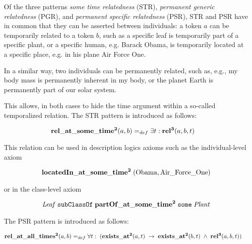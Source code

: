 
 

Of the three patterns \emph{some time relatedness} (STR), \emph{permanent generic relatedness} (PGR), and \emph{permanent specific relatedness} (PSR), STR and PSR have in common that they can be asserted between individuals: a token $a$ can be temporarily related to a token $b$, such as a specific leaf is temporarily part of a specific plant, or a specific human, e.g. Barack Obama, is temporarily located at a specific place, e.g. in his plane Air Force One.

In a similar way, two individuals can be permanently related, such as, e.g., my body mass is permanently inherent in my body, or the planet Earth is permanently part of our solar system.

This allows, in both cases to hide the time argument within a so-called temporalized relation.
The STR pattern is introduced as follows:  

\begin{equation}
\begin{split}
\mathrm{\mathbf{rel\_at\_some\_time^2}} (a,b) =_{def}&\; \exists t: \mathrm{\mathbf{rel^3}}(a,b,t)  
\end{split}
\label{eq:temporarily:ind}
\end{equation}

This relation can be used in description logics axioms such as the individual-level axiom

\begin{equation}
\begin{split}
\mathrm{\mathbf{locatedIn\_at\_some\_time^2}} \;(\mathrm{Obama}, \mathrm{Air\_Force\_One})  
\end{split}
\label{eq:personlocated}
\end{equation}

or in the class-level axiom

\begin{equation}
\begin{split}
\mathit{Leaf}\;\mathtt{subClassOf}\;\mathrm{\mathbf{partOf\_at\_some\_time^2}}\;\mathtt{some}\;\mathit{Plant}
\end{split}
\label{eq:Leaf}
\end{equation}    

The PSR pattern is introduced as follows:  

\begin{equation}
\begin{split}
\mathrm{\mathbf{rel\_at\_all\_times^2}} (a,b) =_{def}&\;
\forall t: \; (\mathrm{\mathbf{exists\_at^2}} (a, t) \; \rightarrow \; \mathrm{\mathbf{exists\_at^2}} (b, t) \; \wedge \; \mathrm{\mathbf{rel^3}}(a,b,t))  
\end{split}
\label{eq:permanently:ind}
\end{equation}

